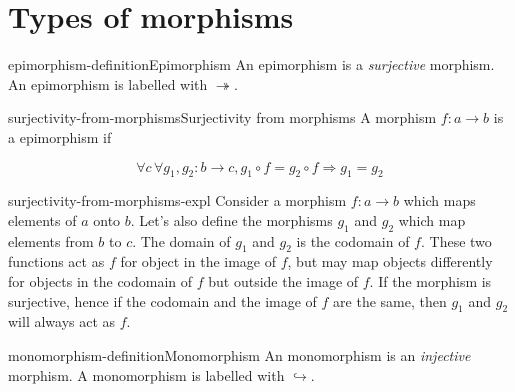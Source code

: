 \documentclass[preview]{standalone}
\begin{document}
\section{Types of morphisms}


\begin{snippetdefinition}{epimorphism-definition}{Epimorphism}
    An epimorphism is a \textit{surjective} morphism.
    An epimorphism is labelled with \(\twoheadrightarrow\).
\end{snippetdefinition}

\begin{snippetdefinition}{surjectivity-from-morphisms}{Surjectivity from morphisms}
    A morphism \(f\colon a \rightarrow b\) is a epimorphism if

    \[
        \forall c\, \forall g_1, g_2 : b \rightarrow c, g_1 \circ f = g_2 \circ f \Rightarrow g_1 = g_2
    \]

    \begin{center}
    \end{center}
\end{snippetdefinition}

\begin{snippet}{surjectivity-from-morphisms-expl}
    Consider a morphism \(f\colon a \rightarrow b\) which maps elements of \(a\) onto \(b\).
    Let's also define the morphisms \(g_1\) and \(g_2\) which map elements from \(b\) to \(c\).
    The domain of \(g_1\) and \(g_2\) is the codomain of \(f\). These two functions act
    as \(f\) for object in the image of \(f\), but may map objects differently
    for objects in the codomain of \(f\) but outside the image of \(f\).
    If the morphism is surjective, hence if the codomain and the image of \(f\) are the same,
    then \(g_1\) and \(g_2\) will always act as \(f\).
\end{snippet}

\begin{snippetdefinition}{monomorphism-definition}{Monomorphism}
    An monomorphism is an \textit{injective} morphism.
    A monomorphism is labelled with \(\hookrightarrow\).
\end{snippetdefinition}
\end{document}
